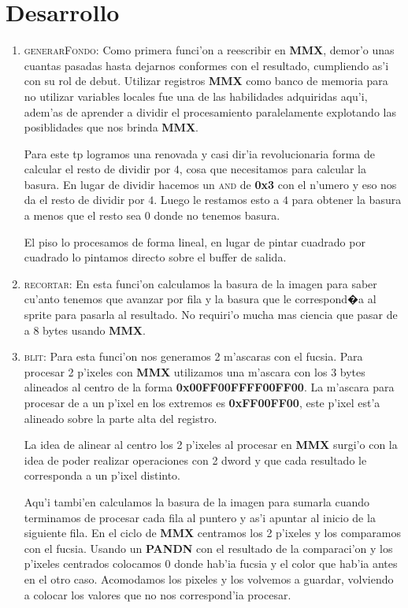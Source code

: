 \section{Desarrollo}

\begin{enumerate}
\item \textsc{generarFondo}:
Como primera funci'on a reescribir en \textbf{MMX}, demor'o unas cuantas pasadas hasta
dejarnos conformes con el resultado, cumpliendo as'i con su rol de debut.
Utilizar registros \textbf{MMX} como banco de memoria para no utilizar variables locales
fue una de las habilidades adquiridas aqu'i, adem'as de aprender a dividir el
procesamiento paralelamente explotando las posiblidades que nos brinda
\textbf{MMX}.

Para este tp logramos una renovada y casi dir'ia revolucionaria forma de
calcular el resto de dividir por $4$, cosa que necesitamos para calcular la
basura. En lugar de dividir hacemos un \textsc{and} de \textbf{0x3} con el
n'umero y eso nos da el resto de dividir por $4$. Luego le restamos esto a $4$
para obtener la basura a menos que el resto sea 0 donde no tenemos basura.

El piso lo procesamos de forma lineal, en lugar de pintar cuadrado por cuadrado
lo pintamos directo sobre el buffer de salida.

\item \textsc{recortar}:
En esta funci'on calculamos la basura de la imagen para saber cu'anto tenemos
que avanzar por fila y la basura que le correspond�a al sprite para pasarla al
resultado. No requiri'o mucha mas ciencia que pasar de a 8 bytes usando \textbf{MMX}.

\item \textsc{blit}:
Para esta funci'on nos generamos 2 m'ascaras con el fucsia. Para procesar 2
p'ixeles con \textbf{MMX} utilizamos una m'ascara con los 3 bytes alineados al
centro de la forma \textbf{0x00FF00FFFF00FF00}. La m'ascara para procesar de a
un p'ixel en los extremos es \textbf{0xFF00FF00}, este p'ixel est'a alineado
sobre la parte alta del registro.

La idea de alinear al centro los 2 p'ixeles al procesar en \textbf{MMX} surgi'o
con la idea de poder realizar operaciones con 2 dword y que cada resultado 
le corresponda a un p'ixel distinto. 

Aqu'i tambi'en calculamos la basura de la imagen para sumarla cuando terminamos
de procesar cada fila al puntero y as'i apuntar al inicio de la siguiente fila.
En el ciclo de \textbf{MMX} centramos los 2 p'ixeles y los comparamos con el fucsia.
Usando un \textbf{PANDN}\cite{INT97} con el resultado de la comparaci'on y los p'ixeles centrados
colocamos 0 donde hab'ia fucsia y el color que hab'ia antes en el otro caso.
Acomodamos los pixeles y los volvemos a guardar, volviendo a colocar los
valores que no nos correspond'ia procesar.


\end{enumerate}
